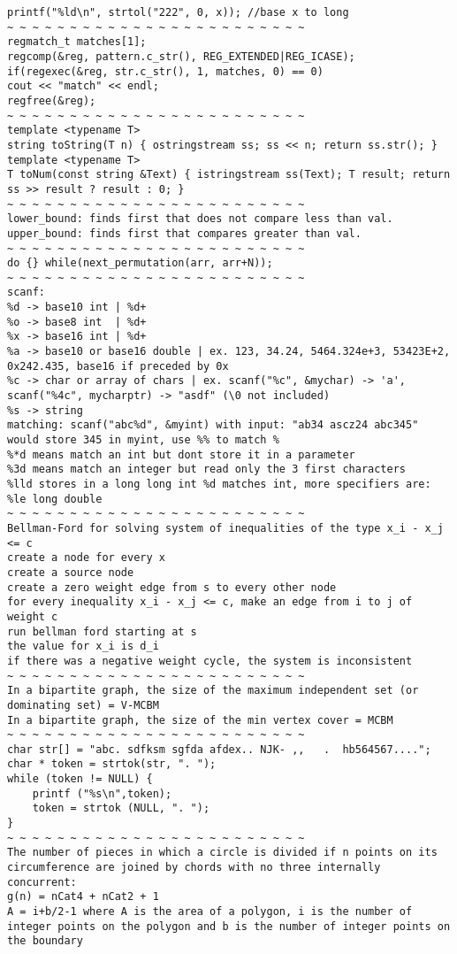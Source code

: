 \documentclass[8pt, oneside]{extarticle}
\begin{document}
\begin{multicols}{3}
\begin{lstlisting}
printf("%ld\n", strtol("222", 0, x)); //base x to long
~ ~ ~ ~ ~ ~ ~ ~ ~ ~ ~ ~ ~ ~ ~ ~ ~ ~ ~ ~ ~ ~ ~ ~
regmatch_t matches[1];
regcomp(&reg, pattern.c_str(), REG_EXTENDED|REG_ICASE);
if(regexec(&reg, str.c_str(), 1, matches, 0) == 0)
cout << "match" << endl;
regfree(&reg);
~ ~ ~ ~ ~ ~ ~ ~ ~ ~ ~ ~ ~ ~ ~ ~ ~ ~ ~ ~ ~ ~ ~ ~
template <typename T>
string toString(T n) { ostringstream ss; ss << n; return ss.str(); }
template <typename T>
T toNum(const string &Text) { istringstream ss(Text); T result; return ss >> result ? result : 0; }
~ ~ ~ ~ ~ ~ ~ ~ ~ ~ ~ ~ ~ ~ ~ ~ ~ ~ ~ ~ ~ ~ ~ ~
lower_bound: finds first that does not compare less than val.
upper_bound: finds first that compares greater than val.
~ ~ ~ ~ ~ ~ ~ ~ ~ ~ ~ ~ ~ ~ ~ ~ ~ ~ ~ ~ ~ ~ ~ ~
do {} while(next_permutation(arr, arr+N));
~ ~ ~ ~ ~ ~ ~ ~ ~ ~ ~ ~ ~ ~ ~ ~ ~ ~ ~ ~ ~ ~ ~ ~
scanf:
%d -> base10 int | %d+
%o -> base8 int  | %d+
%x -> base16 int | %d+
%a -> base10 or base16 double | ex. 123, 34.24, 5464.324e+3, 53423E+2, 0x242.435, base16 if preceded by 0x
%c -> char or array of chars | ex. scanf("%c", &mychar) -> 'a', scanf("%4c", mycharptr) -> "asdf" (\0 not included)
%s -> string
matching: scanf("abc%d", &myint) with input: "ab34 ascz24 abc345" would store 345 in myint, use %% to match %
%*d means match an int but dont store it in a parameter
%3d means match an integer but read only the 3 first characters
%lld stores in a long long int %d matches int, more specifiers are:
%le long double
~ ~ ~ ~ ~ ~ ~ ~ ~ ~ ~ ~ ~ ~ ~ ~ ~ ~ ~ ~ ~ ~ ~ ~
Bellman-Ford for solving system of inequalities of the type x_i - x_j <= c
create a node for every x
create a source node
create a zero weight edge from s to every other node
for every inequality x_i - x_j <= c, make an edge from i to j of weight c
run bellman ford starting at s
the value for x_i is d_i
if there was a negative weight cycle, the system is inconsistent
~ ~ ~ ~ ~ ~ ~ ~ ~ ~ ~ ~ ~ ~ ~ ~ ~ ~ ~ ~ ~ ~ ~ ~
In a bipartite graph, the size of the maximum independent set (or dominating set) = V-MCBM
In a bipartite graph, the size of the min vertex cover = MCBM
~ ~ ~ ~ ~ ~ ~ ~ ~ ~ ~ ~ ~ ~ ~ ~ ~ ~ ~ ~ ~ ~ ~ ~
char str[] = "abc. sdfksm sgfda afdex.. NJK- ,,   .  hb564567....";
char * token = strtok(str, ". ");
while (token != NULL) {
    printf ("%s\n",token);
    token = strtok (NULL, ". ");
}
~ ~ ~ ~ ~ ~ ~ ~ ~ ~ ~ ~ ~ ~ ~ ~ ~ ~ ~ ~ ~ ~ ~ ~
The number of pieces in which a circle is divided if n points on its circumference are joined by chords with no three internally concurrent:
g(n) = nCat4 + nCat2 + 1
A = i+b/2-1 where A is the area of a polygon, i is the number of integer points on the polygon and b is the number of integer points on the boundary

\end{lstlisting}
\end{multicols}
\end{document}
